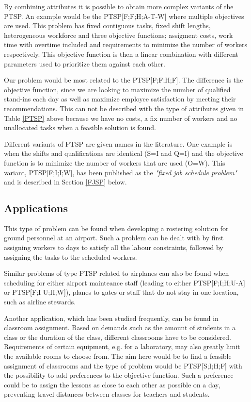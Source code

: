 By combining attributes it is possible to obtain more complex variants of the PTSP. An example would be the PTSP[F;F;H;A-T-W] where multiple objectives are used. This problem has fixed contiguous tasks, fixed shift lengths, heterogeneous workforce and three objective functions; assigment costs, work time with overtime included and requirements to minimize the number of workers respectively. This objective function is then a linear combination with different parameters used to prioritize them against each other.

Our problem would be most related to the PTSP[F;F;H;F]. The difference is the objective function, since we are looking to maximize the number of qualified stand-ins each day as well as maximize employee satisfaction by meeting their recommendations. This can not be described with the type of attributes given in Table \ref{PTSP} above because we have no costs, a fix number of workers and no unallocated tasks when a feasible solution is found. 

Different variants of PTSP are given names in the literature. One example is when the shifts and qualifications are identical (S=I and Q=I) and the objective function is to minimize the number of workers that are used (O=W). This variant, PTSP[F;I;I;W], has been published as the \textit{"fixed job schedule problem"} and is described in Section \ref{FJSP} below.

\subsection{Applications}
This type of problem can be found when developing a rostering solution for ground personnel at an airport. Such a problem can be dealt with by first assigning workers to days to satisfy all the labour constraints, followed by assigning the tasks to the scheduled workers.

Similar problems of type PTSP related to airplanes can also be found when scheduling for either airport mainteance staff (leading to either PTSP[F;I;H;U-A] or PTSP[F;I-U;H;W]), planes to gates or staff that do not stay in one location, such as airline stewards. 

Another application, which has been studied frequently, can be found in classroom assignment. Based on demands such as the amount of students in a class or the duration of the class, different classrooms have to be considered. Requirements of certain equipment, e.g. for a laboratory, may also greatly limit the available rooms to choose from. The aim here would be to find a feasible assignment of classrooms and the type of problem would be PTSP[S;I;H;F] with the possibility to add preferences to the objective function. Such a preference could be to assign the lessons as close to each other as possible on a day, preventing travel distances between classes for teachers and students.


